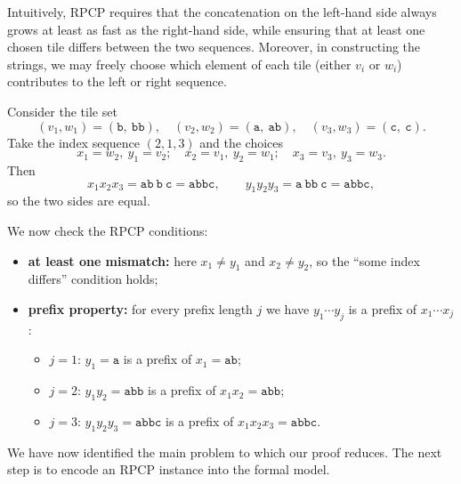 Intuitively, RPCP requires that the concatenation on the left-hand side always 
grows at least as fast as the right-hand side, while ensuring that at least one 
chosen tile differs between the two sequences. Moreover, in constructing the 
strings, we may freely choose which element of each tile (either $v_i$ or $w_i$) 
contributes to the left or right sequence.

\bigskip

\begin{example}\label{exmp:rpcp}
Consider the tile set
\[
(v_1,w_1)=(\texttt{b},\ \texttt{bb}),\quad
(v_2,w_2)=(\texttt{a},\ \texttt{ab}),\quad
(v_3,w_3)=(\texttt{c},\ \texttt{c}).
\]
Take the index sequence $(2,1,3)$ and the choices
\[
x_1 = w_2,\ y_1 = v_2;\quad
x_2 = v_1,\ y_2 = w_1;\quad
x_3 = v_3,\ y_3 = w_3.
\]
Then
\[
x_1 x_2 x_3 = \texttt{ab}\ \texttt{b}\ \texttt{c} = \texttt{abbc},
\qquad
y_1 y_2 y_3 = \texttt{a}\ \texttt{bb}\ \texttt{c} = \texttt{abbc},
\]
so the two sides are equal.

We now check the RPCP conditions:
\begin{itemize}
  \item \textbf{at least one mismatch:} here $x_1\neq y_1$ and
        $x_2\neq y_2$, so the ``some index differs'' condition holds;
  \item \textbf{prefix property:} for every prefix length $j$ we have
        $y_{1}\cdots y_{j}$ is a prefix of $x_{1}\cdots x_{j}$:
        \begin{itemize}
          \item $j=1$: $y_1=\texttt{a}$ is a prefix of $x_1=\texttt{ab}$;
          \item $j=2$: $y_1y_2=\texttt{abb}$ is a prefix of $x_1x_2=\texttt{abb}$;
          \item $j=3$: $y_1y_2y_3=\texttt{abbc}$ is a prefix of $x_1x_2x_3=\texttt{abbc}$.
        \end{itemize}
\end{itemize}
\end{example}

\bigskip

We have now identified the main problem to which our proof reduces.  
The next step is to encode an RPCP instance into the formal model.

\bigskip


